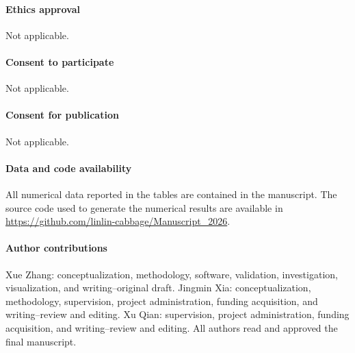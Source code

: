 \documentclass[pdflatex,sn-mathphys-num]{sn-jnl}%
\theoremstyle{thmstyleone}%
\theoremstyle{thmstyletwo}%
\theoremstyle{thmstylethree}%
\begin{document}
\paragraph{Ethics approval}
Not applicable.

\paragraph{Consent to participate}
Not applicable.

\paragraph{Consent for publication}
Not applicable.

\paragraph{Data and code availability}
All numerical data reported in the tables are contained in the manuscript. The source code used to generate the numerical results are available in \url{https://github.com/linlin-cabbage/Manuscript_2026}.

\paragraph{Author contributions}
Xue Zhang: conceptualization, methodology, software, validation, investigation, visualization, and writing--original draft. Jingmin Xia: conceptualization, methodology, supervision, project administration, funding acquisition, and writing--review and editing. Xu Qian: supervision, project administration, funding acquisition, and writing--review and editing. All authors read and approved the final manuscript.

\end{document}
